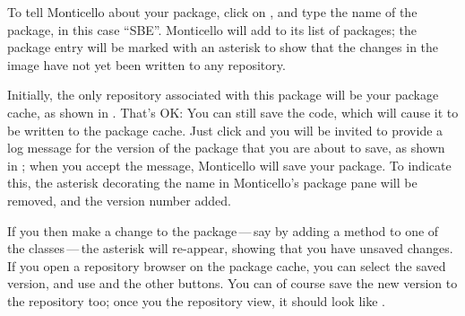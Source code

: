 \documentclass[a4paper,10pt,twoside]{book}
\begin{document}
To tell Monticello about your package, click on , and type the name of the package, in this case ``SBE''.
Monticello will add  to its list of packages; the package entry will be marked with an asterisk to show that the changes in the image have not yet been written to any repository.

Initially, the only repository associated with this package will be your package cache, as shown in .
That's OK:
You can still save the code, which will cause it to be written to the package cache.
Just click  and you will be invited to provide a log message for the version of the package that you are about to save, as shown in ; when you accept the message, Monticello will save your package.
To indicate this, the asterisk decorating the name in Monticello's package pane will be removed, and the version number added.

If you then make a change to the package\,---\,say by adding a method to one of the classes\,---\,the asterisk will re-appear, showing that you have unsaved changes.  If you open a repository browser on the package cache, you can select the saved version, and use  and the other buttons.
You can of course save the new version to the repository too; once you  the repository view, it should look like .
\end{document}
